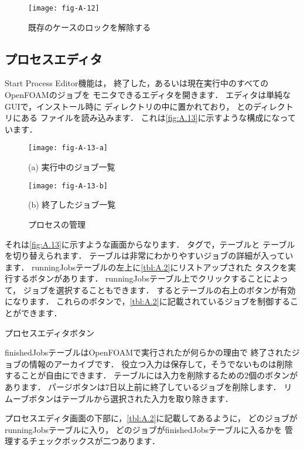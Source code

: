 \begin{figure}[ht]
 \texttt{[image: fig-A-12]}
 \caption{既存のケースのロックを解除する}
 \label{fig:A.12}
\end{figure}


\subsection{プロセスエディタ}
\label{ssec:A.3.7}
Start Process Editor機能は，
終了した，あるいは現在実行中のすべてのOpenFOAMのジョブを
モニタできるエディタを開きます．
エディタは単純なGUIで，インストール時に
ディレクトリの中に置かれており，
とのディレクトリにある
ファイルを読み込みます．
これは\autoref{fig:A.13}に示すような構成になっています．


\begin{figure}[ht]
 \texttt{[image: fig-A-13-a]}\par
 (a) 実行中のジョブ一覧\par
 \medskip
 \texttt{[image: fig-A-13-b]}\par
 (b) 終了したジョブ一覧
 \caption{プロセスの管理}
 \label{fig:A.13}
\end{figure}


それは\autoref{fig:A.13}に示すような画面からなります．
タグで，テーブルと
テーブルを切り替えられます．
テーブルは非常にわかりやすいジョブの詳細が入っています．
runningJobsテーブルの左上に\autoref{tbl:A.2}にリストアップされた
タスクを実行するボタンがあります．
runningJobsテーブル上でクリックすることによって，
ジョブを選択することもできます．
するとテーブルの右上のボタンが有効になります．
これらのボタンで，\autoref{tbl:A.2}に記載されているジョブを制御することができます．


\begin{table}[ht]
 
 \caption{プロセスエディタボタン}
 \label{tbl:A.2}
\end{table}


finishedJobsテーブルはOpenFOAMで実行されたが何らかの理由で
終了されたジョブの情報のアーカイブです．
役立つ入力は保存して，そうでないものは削除することが自由にできます．
テーブルには入力を削除するための2個のボタンがあります．
パージボタンは7日以上前に終了しているジョブを削除します．
リムーブボタンはテーブルから選択された入力を取り除きます．

プロセスエディタ画面の下部に，\autoref{tbl:A.2}に記載してあるように，
どのジョブがrunningJobsテーブルに入り，
どのジョブがfinishedJobsテーブルに入るかを
管理するチェックボックスが二つあります．


